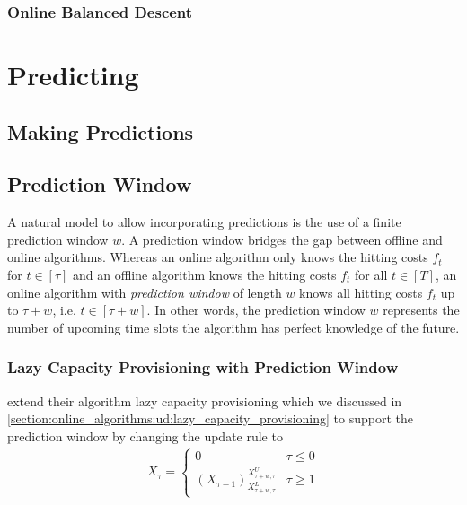 \subsubsection{Online Balanced Descent}

\section{Predicting}\label{section:online_algorithms:md:predictions}

\subsection{Making Predictions}

\subsection{Prediction Window}

A natural model to allow incorporating predictions is the use of a finite prediction window $w$. A prediction window bridges the gap between offline and online algorithms. Whereas an online algorithm only knows the hitting costs $f_t$ for $t \in [\tau]$ and an offline algorithm knows the hitting costs $f_t$ for all $t \in [T]$, an online algorithm with \emph{prediction window} of length $w$ knows all hitting costs $f_t$ up to $\tau + w$, i.e. $t \in [\tau + w]$. In other words, the prediction window $w$ represents the number of upcoming time slots the algorithm has perfect knowledge of the future.

\subsubsection{Lazy Capacity Provisioning with Prediction Window}

\citeauthor*{Lin2011} extend their algorithm lazy capacity provisioning which we discussed in \autoref{section:online_algorithms:ud:lazy_capacity_provisioning} to support the prediction window by changing the update rule to \begin{align*}
    X_{\tau} = \begin{cases}
        0 & \tau \leq 0 \\
        (X_{\tau-1})_{X_{\tau+w,\tau}^L}^{X_{\tau+w,\tau}^U} & \tau \geq 1
    \end{cases}
\end{align*}

